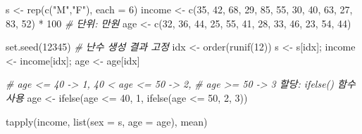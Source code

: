 \documentclass[
  11pt,
]{krantz}
\newenvironment{Shaded}{\begin{snugshade}}{\end{snugshade}}
\newcommand{\AttributeTok}[1]{\textcolor[rgb]{0.61,0.61,0.61}{#1}}
\newcommand{\CommentTok}[1]{\textcolor[rgb]{0.37,0.37,0.37}{\textit{#1}}}
\newcommand{\DecValTok}[1]{\textcolor[rgb]{0.06,0.06,0.06}{#1}}
\newcommand{\FunctionTok}[1]{\textcolor[rgb]{0,0,0}{#1}}
\newcommand{\NormalTok}[1]{#1}
\newcommand{\OtherTok}[1]{\textcolor[rgb]{0.37,0.37,0.37}{#1}}
\newcommand{\SpecialCharTok}[1]{\textcolor[rgb]{0,0,0}{#1}}
\newcommand{\StringTok}[1]{\textcolor[rgb]{0.5,0.5,0.5}{#1}}
\begin{document}
\footnotesize

\begin{Shaded}
\begin{Highlighting}[]
\NormalTok{s }\OtherTok{\textless{}{-}} \FunctionTok{rep}\NormalTok{(}\FunctionTok{c}\NormalTok{(}\StringTok{"M"}\NormalTok{,}\StringTok{"F"}\NormalTok{), }\AttributeTok{each =} \DecValTok{6}\NormalTok{)}
\NormalTok{income }\OtherTok{\textless{}{-}} \FunctionTok{c}\NormalTok{(}\DecValTok{35}\NormalTok{, }\DecValTok{42}\NormalTok{, }\DecValTok{68}\NormalTok{, }\DecValTok{29}\NormalTok{, }\DecValTok{85}\NormalTok{, }\DecValTok{55}\NormalTok{, }
            \DecValTok{30}\NormalTok{, }\DecValTok{40}\NormalTok{, }\DecValTok{63}\NormalTok{, }\DecValTok{27}\NormalTok{, }\DecValTok{83}\NormalTok{, }\DecValTok{52}\NormalTok{) }\SpecialCharTok{*} \DecValTok{100} \CommentTok{\# 단위: 만원}
\NormalTok{age }\OtherTok{\textless{}{-}} \FunctionTok{c}\NormalTok{(}\DecValTok{32}\NormalTok{, }\DecValTok{36}\NormalTok{, }\DecValTok{44}\NormalTok{, }\DecValTok{25}\NormalTok{, }\DecValTok{55}\NormalTok{, }\DecValTok{41}\NormalTok{, }
         \DecValTok{28}\NormalTok{, }\DecValTok{33}\NormalTok{, }\DecValTok{46}\NormalTok{, }\DecValTok{23}\NormalTok{, }\DecValTok{54}\NormalTok{, }\DecValTok{44}\NormalTok{)}

\FunctionTok{set.seed}\NormalTok{(}\DecValTok{12345}\NormalTok{) }\CommentTok{\# 난수 생성 결과 고정}
\NormalTok{idx }\OtherTok{\textless{}{-}} \FunctionTok{order}\NormalTok{(}\FunctionTok{runif}\NormalTok{(}\DecValTok{12}\NormalTok{))}
\NormalTok{s }\OtherTok{\textless{}{-}}\NormalTok{ s[idx]; income }\OtherTok{\textless{}{-}}\NormalTok{ income[idx]; age }\OtherTok{\textless{}{-}}\NormalTok{ age[idx]}

\CommentTok{\# age \textless{}= 40 {-}\textgreater{} 1, 40 \textless{} age \textless{}= 50 {-}\textgreater{} 2, }
\CommentTok{\# age \textgreater{}= 50 {-}\textgreater{} 3 할당: ifelse() 함수 사용}
\NormalTok{age }\OtherTok{\textless{}{-}} \FunctionTok{ifelse}\NormalTok{(age }\SpecialCharTok{\textless{}=} \DecValTok{40}\NormalTok{, }\DecValTok{1}\NormalTok{, }
       \FunctionTok{ifelse}\NormalTok{(age }\SpecialCharTok{\textless{}=} \DecValTok{50}\NormalTok{, }\DecValTok{2}\NormalTok{, }\DecValTok{3}\NormalTok{))}

\FunctionTok{tapply}\NormalTok{(income, }\FunctionTok{list}\NormalTok{(}\AttributeTok{sex =}\NormalTok{ s, }\AttributeTok{age =}\NormalTok{ age), mean)}
\end{Highlighting}
\end{Shaded}
\end{document}
